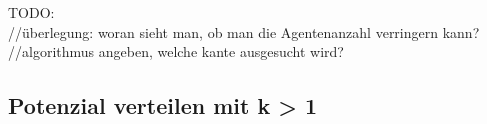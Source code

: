 TODO:\\
//überlegung: woran sieht man, ob man die Agentenanzahl verringern kann?\\
//algorithmus angeben, welche kante ausgesucht wird?\\

\subsection{Potenzial verteilen mit k > 1}